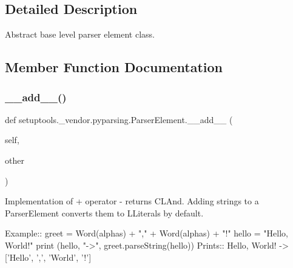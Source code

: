 \subsection{Detailed Description}
\begin{DoxyVerb}Abstract base level parser element class.\end{DoxyVerb}
 

\subsection{Member Function Documentation}
\mbox{\label{classsetuptools_1_1__vendor_1_1pyparsing_1_1_parser_element_ad846d0bf79031f29ae3e9aa6274db70c}} 
\subsubsection{\texorpdfstring{\+\_\+\+\_\+add\+\_\+\+\_\+()}{\_\_add\_\_()}}
{\footnotesize\ttfamily def setuptools.\+\_\+vendor.\+pyparsing.\+Parser\+Element.\+\_\+\+\_\+add\+\_\+\+\_\+ (\begin{DoxyParamCaption}\item[{}]{self,  }\item[{}]{other }\end{DoxyParamCaption})}

\begin{DoxyVerb}Implementation of + operator - returns C{L{And}}. Adding strings to a ParserElement
converts them to L{Literal}s by default.

Example::
    greet = Word(alphas) + "," + Word(alphas) + "!"
    hello = "Hello, World!"
    print (hello, "->", greet.parseString(hello))
Prints::
    Hello, World! -> ['Hello', ',', 'World', '!']
\end{DoxyVerb}
 \mbox{\label{classsetuptools_1_1__vendor_1_1pyparsing_1_1_parser_element_a5c86bc8ef351451455d2d026ced27a0a}} 
